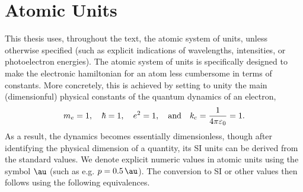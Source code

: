 

\chapter{Atomic Units}
\label{chap:atomic-units}

\singlespacing

This thesis uses, throughout the text, the atomic system of units, unless otherwise specified (such as explicit indications of wavelengths, intensities, or photoelectron energies). The atomic system of units is specifically designed to make the electronic hamiltonian for an atom less cumbersome in terms of constants. More concretely, this is achieved by setting to unity the main (dimensionful) physical constants of the quantum dynamics of an electron,
\begin{equation}
m_e=1
,\quad
\hbar=1
,\quad
e^2=1
,\quad\text{and}\quad
k_\mathrm{c} = \frac{1}{4\pi\varepsilon_0}=1
.
\end{equation}
As a result, the dynamics becomes essentially dimensionless, though after identifying the physical dimension of a quantity, its SI units can be derived from the standard values. We denote explicit numeric values in atomic units using the symbol $\SI{}{\au}$ (such as e.g. $p=\SI{0.5}{\au}$). The conversion to SI or other values then follows using the following equivalences.

